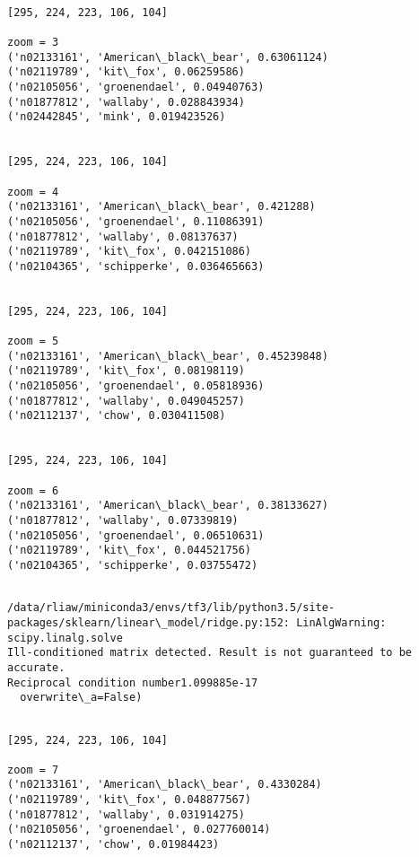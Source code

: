 \documentclass[11pt]{article}
\begin{document}
    \begin{Verbatim}[commandchars=\\\{\}]

[295, 224, 223, 106, 104]

zoom = 3
('n02133161', 'American\_black\_bear', 0.63061124)
('n02119789', 'kit\_fox', 0.06259586)
('n02105056', 'groenendael', 0.04940763)
('n01877812', 'wallaby', 0.028843934)
('n02442845', 'mink', 0.019423526)


[295, 224, 223, 106, 104]

zoom = 4
('n02133161', 'American\_black\_bear', 0.421288)
('n02105056', 'groenendael', 0.11086391)
('n01877812', 'wallaby', 0.08137637)
('n02119789', 'kit\_fox', 0.042151086)
('n02104365', 'schipperke', 0.036465663)


[295, 224, 223, 106, 104]

zoom = 5
('n02133161', 'American\_black\_bear', 0.45239848)
('n02119789', 'kit\_fox', 0.08198119)
('n02105056', 'groenendael', 0.05818936)
('n01877812', 'wallaby', 0.049045257)
('n02112137', 'chow', 0.030411508)


[295, 224, 223, 106, 104]

zoom = 6
('n02133161', 'American\_black\_bear', 0.38133627)
('n01877812', 'wallaby', 0.07339819)
('n02105056', 'groenendael', 0.06510631)
('n02119789', 'kit\_fox', 0.044521756)
('n02104365', 'schipperke', 0.03755472)


    \end{Verbatim}

    \begin{Verbatim}[commandchars=\\\{\}]
/data/rliaw/miniconda3/envs/tf3/lib/python3.5/site-packages/sklearn/linear\_model/ridge.py:152: LinAlgWarning: scipy.linalg.solve
Ill-conditioned matrix detected. Result is not guaranteed to be accurate.
Reciprocal condition number1.099885e-17
  overwrite\_a=False)

    \end{Verbatim}

    \begin{Verbatim}[commandchars=\\\{\}]

[295, 224, 223, 106, 104]

zoom = 7
('n02133161', 'American\_black\_bear', 0.4330284)
('n02119789', 'kit\_fox', 0.048877567)
('n01877812', 'wallaby', 0.031914275)
('n02105056', 'groenendael', 0.027760014)
('n02112137', 'chow', 0.01984423)


    \end{Verbatim}
\end{document}
